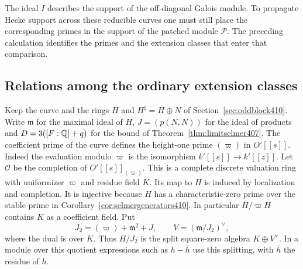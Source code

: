 \documentclass[a4paper,11pt]{article}
\theoremstyle{definition}
\theoremstyle{remark}
\numberwithin{equation}{section}
\begin{document}
The ideal \(I\) describes the support of the off-diagonal
Galois module. To propagate Hecke support across these
reducible curves one must still place the corresponding
primes in the support of the patched module \(\mathcal P\).
The preceding calculation identifies the primes and the
extension classes that enter that comparison.


\subsection{Relations among the ordinary extension classes}
\label{sec:oddrelations411}

Keep the curve and the rings \(H\) and \(H^\sharp=H\oplus N\)
of Section~\ref{sec:oddblock410}. Write \(\mathfrak m\) for
the maximal ideal of \(H\), \(J=(p(N,N))\) for the ideal of
products and \(D=3([F:\mathbb Q]+q)\) for the bound of
Theorem~\ref{thm:limitselmer407}. The coefficient prime of the
curve defines the height-one prime \((\varpi)\) in \(O'[[s]]\).
Indeed the evaluation modulo \(\varpi\) is the isomorphism
\(k'[[s]]\to k'[[z]]\). Let \(\mathcal O\) be the completion
of \(O'[[s]]_{(\varpi)}\). This is a complete discrete valuation
ring with uniformizer \(\varpi\) and residue field \(K\).
Its map to \(H\) is induced by localization and completion.
It is injective because \(H\) has a characteristic-zero
prime over the stable prime in Corollary~\ref{cor:selmergenerators410}.
In particular \(H/\varpi H\) contains \(K\) as a coefficient
field. Put
\[
 J_2=(\varpi)+\mathfrak m^2+J,\qquad
 V=(\mathfrak m/J_2)^\vee ,
\]
where the dual is over \(K\). Thus \(H/J_2\) is the
split square-zero algebra \(K\oplus V^\vee\). In a module
over this quotient expressions such as \(h-\bar h\) use
this splitting, with \(\bar h\) the residue of \(h\).
\end{document}

